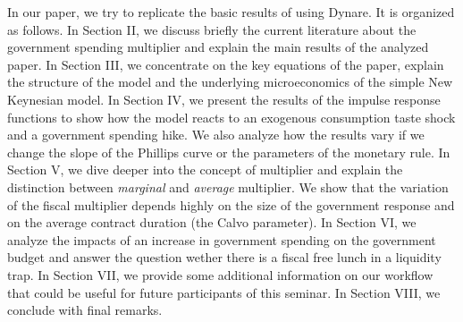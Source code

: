 In our paper, we try to replicate the basic results of \citet{Erceg.2014} using Dynare. It is organized as follows. In Section II, we discuss briefly the current literature about the government spending multiplier and explain the main results of the analyzed paper. In Section III, we concentrate on the key equations of the paper, explain the structure of the model and the underlying microeconomics of the simple New Keynesian model. In Section IV, we present the results of the impulse response functions to show how the model reacts to an exogenous consumption taste shock and a government spending hike. We also analyze how the results vary if we change the slope of the Phillips curve or the parameters of the monetary rule. In Section V, we dive deeper into the concept of multiplier and explain the distinction between \textit{marginal} and \textit{average} multiplier. We show that the variation of the fiscal multiplier depends highly on the size of the government response and on the average contract duration (the Calvo parameter). In Section VI, we analyze the impacts of an increase in government spending on the government budget and answer the question wether there is a fiscal free lunch in a liquidity trap. In Section VII, we provide some additional information on our workflow that could be useful for future participants of this seminar. In Section VIII, we conclude with final remarks.

